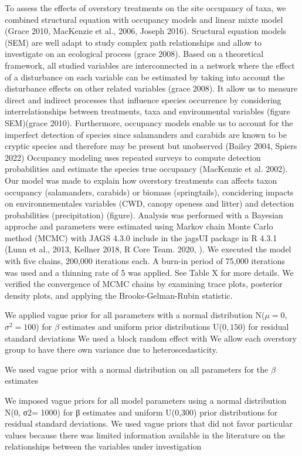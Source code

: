 To assess the effects of overstory treatments on the site occupancy of taxa, we combined structural equation with occupancy models and linear mixte model (Grace 2010, MacKenzie et al., 2006, Joseph 2016).
Sructural equation models (SEM) are well adapt to study complex path relationships and allow to investigate on an ecological process (grace 2008).
Based on a theoretical framework, all studied variables are interconnected in a network where the effect of a disturbance on each variable can be estimated by taking into account 
the disturbance effects on other related variables (grace 2008).
It allow us to measure direct and indirect processes that influence species occurrence by considering interrelationships between treatments, taxa and environmental variables (figure SEM)(grace 2010).
Furthermore, occupancy models enable us to account for the imperfect detection of species since salamanders and carabids are known to be cryptic species and therefore may be present but unobserved (Bailey 2004, Spiers 2022)
Occupancy modeling uses repeated surveys to compute detection probabilities and estimate the species true occupancy (MacKenzie et al. 2002).
Our model was made to explain how overstory treatments can affects taxon occupancy (salamanders, carabids) or biomass (springtails), concidering impacts on environnementales variables 
(CWD, canopy openess and litter) and detection probabilities (precipitation) (figure).
Analysis was performed with a Bayesian approche and parameters were estimated using Markov chain Monte Carlo method (MCMC) with JAGS 4.3.0 include in the jagsUI package in R 4.3.1 (Lunn et al., 2013, Kellner 2018, R Core Team. 2020, ). 
We executed the model with five chains, 200,000 iterations each. A burn-in period of 75,000 iterations was used and a thinning rate of 5 was applied. See Table X for more details.
We verified the convergence of MCMC chains by examining trace plots, posterior density plots, and applying the Brooks-Gelman-Rubin statistic.

We applied vague prior for all parameters with a normal distribution N($\mu = 0$, $\sigma^2 = 100$) for $\beta$ estimates and uniform prior distributions U($0,150$) for residual standard deviations
We used a block random effect with 
We allow each overstory group to have there own variance due to heteroscedasticity.

We used vague prior with a normal distribution on all parameters for the $\beta$ estimates



We imposed vague priors for all model parameters using a normal distribution N(0, σ2= 1000) for β estimates and uniform U(0,300) prior distributions for residual standard deviations. 
We used vague priors that did not favor particular values because there was limited information available in the literature on the relationships between the variables under investigation



